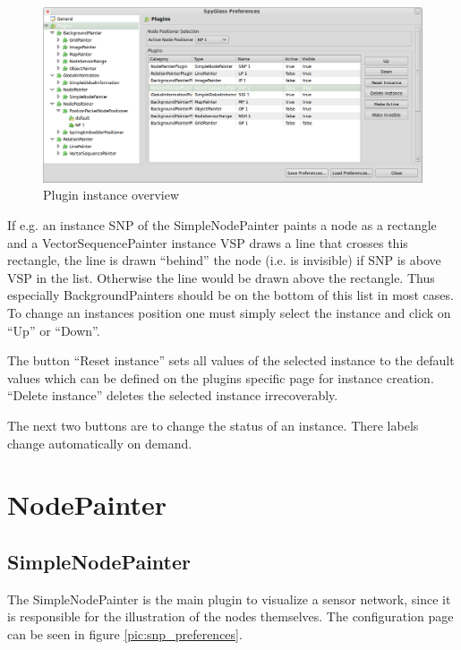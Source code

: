 \begin{figure}[htb]
  \begin{center}
    \includegraphics[width=13.2cm]{./pics/plugin_instances_overview}
    \caption{Plugin instance overview}
    \label{pic:plugin_instances_overview}
  \end{center}
\end{figure}

If e.g. an instance SNP of the SimpleNodePainter paints a node as a rectangle and a VectorSequencePainter instance VSP
draws a line that crosses this rectangle, the line is drawn ``behind'' the node (i.e. is invisible) if SNP
is above VSP in the list. Otherwise the line would be drawn above the rectangle. Thus especially BackgroundPainters
should be on the bottom of this list in most cases. To change an
instances position one must simply select the instance and click on ``Up'' or ``Down''.

The button ``Reset instance'' sets all values of the selected instance to the default values which can be defined on the
plugins specific page for instance creation. ``Delete instance'' deletes the selected instance irrecoverably.

The next two buttons are to change the status of an instance. There labels change automatically on demand.

\newpage
\section{NodePainter}

\subsection{SimpleNodePainter}

The SimpleNodePainter is the main plugin to visualize a sensor network, since it is responsible for the illustration
of the nodes themselves. The configuration page can be seen in figure \ref{pic:snp_preferences}.

